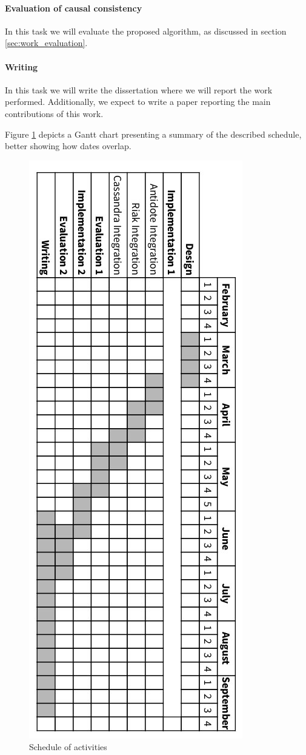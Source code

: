 \paragraph{Evaluation of causal consistency} In this task we will evaluate the proposed algorithm, as discussed in section \ref{sec:work_evaluation}.

\paragraph{Writing} In this task we will write the dissertation where we will report the work performed. Additionally, we expect to write a paper reporting the main contributions of this work.\par

Figure \ref{gant} depicts a Gantt chart presenting a summary of the described schedule, better showing how dates overlap.

\begin{figure}
\centering
\includegraphics[scale=0.6]{files/shedule.jpg}
\caption{Schedule of activities}
\label{gant}
\end{figure}